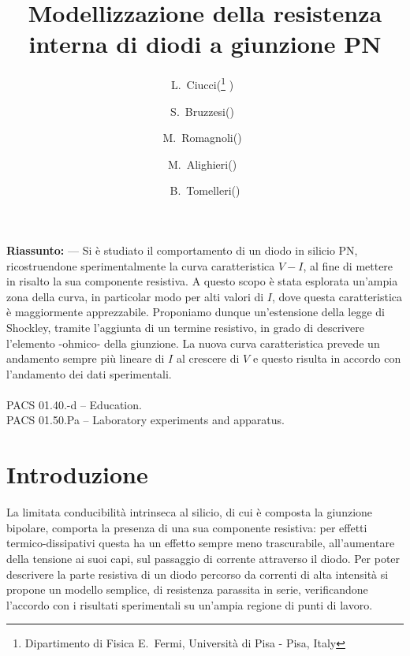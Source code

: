 \documentclass{article}[a4paper, oneside, 11pt]
\title{Modellizzazione della resistenza interna di diodi a giunzione PN}
\author{L.~Ciucci(\thanks{Dipartimento di Fisica E.~Fermi, Universit\`a di Pisa 
- Pisa, Italy} )~\and S.~Bruzzesi(\protect\footnotemark[1] )~\and 
M.~Romagnoli(\protect\footnotemark[1] )~\and 
M.~Alighieri(\protect\footnotemark[1] )~\and 
B.~Tomelleri(\protect\footnotemark[1] )}
\begin{document}
\maketitle

\begin{mdframed}
\textbf{Riassunto:} --- Si \`e studiato il comportamento di un diodo in silicio
PN, ricostruendone sperimentalmente la curva caratteristica $V-I$, al fine di
mettere in risalto la sua componente resistiva. A questo scopo \`e stata
esplorata un'ampia zona della curva, in particolar modo per alti valori di
$I$, dove questa caratteristica \`e maggiormente apprezzabile. Proponiamo dunque
un'estensione della legge di Shockley, tramite l'aggiunta di un termine
resistivo, in grado di descrivere l'elemento -ohmico- della giunzione.
La nuova curva caratteristica prevede un andamento sempre pi\`u lineare di $I$
al crescere di $V$ e questo risulta in accordo con l'andamento dei dati
sperimentali.
\\\\
PACS 01.40.-d – Education.\\
PACS 01.50.Pa – Laboratory experiments and apparatus.
\end{mdframed}


\section{Introduzione}
La limitata conducibilit\`a intrinseca al silicio, di cui \`e composta la
giunzione bipolare, comporta la presenza di una sua componente resistiva:
per effetti termico-dissipativi questa ha un effetto sempre meno
trascurabile, all'aumentare della tensione ai suoi capi, sul passaggio di
corrente attraverso il diodo.
Per poter descrivere la parte resistiva di un diodo percorso da correnti
di alta intensit\`a si propone un modello semplice, di resistenza parassita
in serie, verificandone l'accordo con i risultati sperimentali su un'ampia
regione di punti di lavoro.

\end{document}
